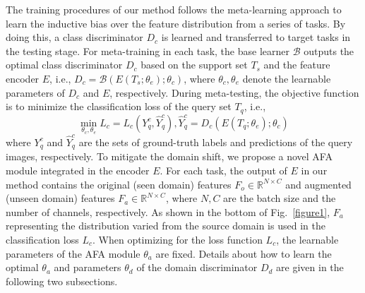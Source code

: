 \documentclass[runningheads]{utils/llncs}
\begin{document}
The training procedures of our method follows the meta-learning approach to learn the inductive bias over the feature distribution from a series of tasks. 
By doing this, a class discriminator $D_c$ is learned and transferred to target tasks in the testing stage. 
For meta-training in each task, the base learner $\mathcal{B}$ outputs the optimal class discriminator $D_c$ based on the support set $T_s$ and the feature encoder $E$, i.e., $D_c = \mathcal{B}(E(T_s; \theta_e); \theta_c)$, where $\theta_c, \theta_e$ denote the learnable parameters of $D_c$ and $E$, respectively.
During meta-testing, the objective function is to minimize the classification loss of the query set $T_q$, i.e.,
\begin{equation}
\label{eq3}
\mathop{\min}\limits_{\theta_c, \theta_e} L_c = {L}_{c}({Y}_{q}^{c}, \hat{{Y}}_{q}^{c}), \hat{{Y}}_{q}^{c} = D_c(E(T_q; \theta_e); \theta_c) 
\end{equation}
where ${Y}_{q}^{c}$ and $\hat{{Y}}_{q}^{c}$ are the sets of ground-truth labels and predictions of the query images, respectively.
To mitigate the domain shift, we propose a novel AFA module integrated in the encoder $E$.
For each task, the output of $E$ in our method contains the original (seen domain) features $F_o\in \mathbb{R} ^ {N \times C}$ and augmented (unseen domain) features $F_a \in \mathbb{R} ^ {N \times C}$, where $N, C$ are the batch size and the number of channels, respectively. 
As shown in the bottom of Fig.~\ref{figure1}, $F_a$ representing the distribution varied from the source domain is used in the classification loss $L_c$.
When optimizing for the loss function $L_c$, the learnable parameters of the AFA module $\theta_a$ are fixed.
Details about how to learn the optimal $\theta_a$ and parameters $\theta_d$ of the domain discriminator $D_d$ are given in the following two subsections.
\end{document}

